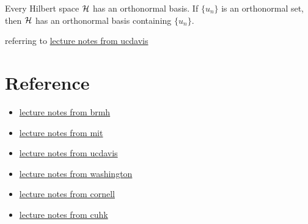 \begin{theorem}{}{}
    Every Hilbert space $\mathcal{H}$ has an orthonormal basis. If $\{u_n\}$ is an orthonormal set, then $\mathcal{H}$ has an orthonormal basis containing $\{u_n\}$. 
\end{theorem}

\begin{proofsolution}
    referring to \href{https://www.math.ucdavis.edu/~hunter/book/ch6.pdf}{lecture notes from ucdavis}
\end{proofsolution}


\section{Reference}
\begin{itemize}
    \item \href{https://web.mat.bham.ac.uk/~malevao/MSM3P21/l14.pdf}{lecture notes from brmh}
    \item \href{https://ocw.mit.edu/courses/18-102-introduction-to-functional-analysis-spring-2021/resources/mit18_102s21_lec14/}{lecture notes from mit}
    \item \href{https://www.math.ucdavis.edu/%7Ehunter/book/ch6.pdf}{lecture notes from ucdavis}
    \item \href{https://sites.math.washington.edu/~burke/crs/555/555_notes/hilbert.pdf}{lecture notes from washington}
    \item \href{https://e.math.cornell.edu/people/belk/measuretheory/HilbertSpaces.pdf}{lecture notes from cornell}
    \item \href{https://www.math.cuhk.edu.hk/course_builder/1415/math5011/functional%20Analysis%202014.pdf}{lecture notes from cuhk}
\end{itemize}